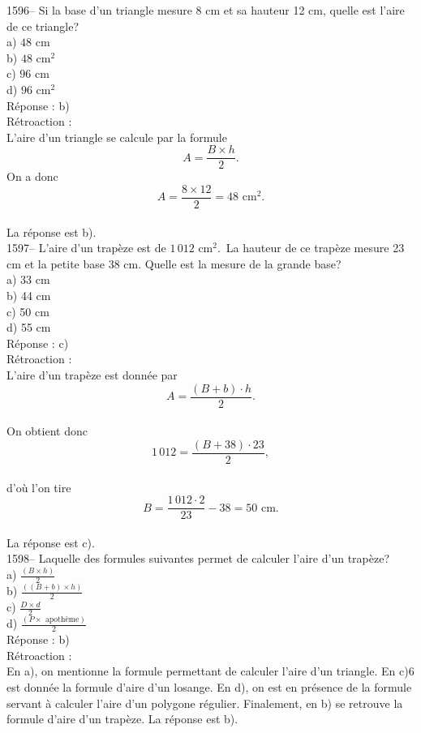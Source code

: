 1596-- Si la base d'un triangle mesure 8 cm et sa hauteur 12
cm, quelle est l'aire de ce triangle?\\
a) $48{\textrm{ cm}}$\\
b) $48{\textrm{ cm}}^2$ \\
c) $96{\textrm{ cm}}$\\
d) $96{\textrm{ cm}}^2$ \\

R\'eponse : b)\\

R\'etroaction :\\
L'aire d'un triangle se calcule par la formule $$A=\frac{B\times
h}{2}.$$
On a donc $$A=\frac{8\times 12}{2}=48{\textrm{ cm}}^2.$$\\
La r\'eponse est b).\\

1597-- L'aire d'un trap\`eze est de $1\,012{\textrm{ cm}}^2.$  \,La
hauteur de ce trap\`eze mesure 23 cm et la petite base 38 cm. Quelle
est la mesure de la grande base?\\
a) 33 cm\\
b) 44 cm\\
c) 50 cm\\
d) 55 cm\\

R\'eponse : c)\\

R\'etroaction :\\
L'aire d'un trap\`eze est donn\'ee par $$A=\frac{(B+b)\cdot
h}{2}.$$\\
On obtient donc $$1\,012=\frac{(B+38)\cdot 23}{2},$$\\d'o\`u l'on tire
$$B=\frac{1\,012\cdot2}{23}-38=50{\textrm{ cm.}}$$\\
La r\'eponse est c).\\

1598-- Laquelle des formules suivantes permet de calculer
l'aire d'un trap\`eze?\\[3mm]
a) $\frac{{(B\times h)}}{2}$\\[3mm]
b) $\frac{{((B+b)\times h)}}{2}$\\[3mm]
c) $\frac{{D\times d}}{2}$\\[3mm]
d) $\frac{{(P\times{\textrm{ apoth\`eme}})}}{2}$\\[3mm]

R\'eponse : b)\\

R\'etroaction :\\
En a), on mentionne la formule permettant de calculer l'aire d'un
triangle. En c)6 est donn\'ee la formule d'aire d'un losange. En d),
on est en pr\'esence de la formule servant \`a  calculer l'aire d'un
polygone r\'egulier. Finalement, en b) se retrouve la formule d'aire
d'un
trap\`eze. La r\'eponse est b).\\

